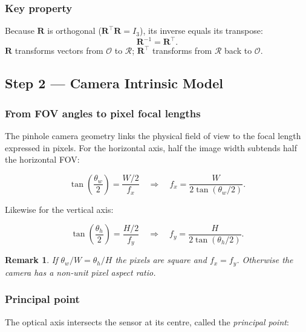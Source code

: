 \documentclass[12pt, a4paper]{article}
\newtheorem{remark}{Remark}
\begin{document}
\subsubsection{Key property}
Because $\mathbf{R}$ is orthogonal ($\mathbf{R}^\top \mathbf{R} = I_3$), its
inverse equals its transpose:
\begin{equation}
\mathbf{R}^{-1} = \mathbf{R}^\top.
\end{equation}
$\mathbf{R}$ transforms vectors from $\mathcal{O}$ to $\mathcal{R}$;
$\mathbf{R}^\top$ transforms from $\mathcal{R}$ back to $\mathcal{O}$.

\subsection{Step 2 — Camera Intrinsic Model}

\subsubsection{From FOV angles to pixel focal lengths}
The pinhole camera geometry links the physical field of view to the focal
length expressed in pixels. For the horizontal axis, half the image width
subtends half the horizontal FOV:

\begin{equation}
\tan\!\left(\frac{\theta_w}{2}\right) = \frac{W/2}{f_x}
\quad\Longrightarrow\quad
\boxed{f_x = \frac{W}{2\tan\!\left(\theta_w/2\right)}}.
\end{equation}

Likewise for the vertical axis:

\begin{equation}
\tan\!\left(\frac{\theta_h}{2}\right) = \frac{H/2}{f_y}
\quad\Longrightarrow\quad
\boxed{f_y = \frac{H}{2\tan\!\left(\theta_h/2\right)}}.
\end{equation}

\begin{remark}
If $\theta_w/W = \theta_h/H$ the pixels are square and $f_x = f_y$.
Otherwise the camera has a non-unit pixel aspect ratio.
\end{remark}

\subsubsection{Principal point}
The optical axis intersects the sensor at its centre, called the
\emph{principal point}:
\end{document}
